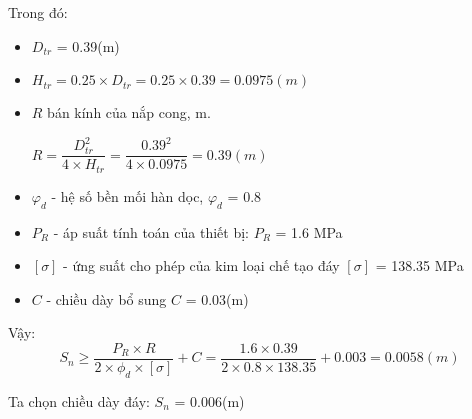 Trong đó:
\begin{itemize}
	\item $D_{tr}$ = 0.39(m)
	\item $H_{tr} = 0.25\times D_{tr} = 0.25 \times 0.39 = 0.0975(m)$
	\item $R$ bán kính của nắp cong, m.
	
	$R = \dfrac{D_{tr}^2}{4\times H_{tr}} = \dfrac{0.39^2}{4 \times 0.0975} = 0.39(m)$
	\item $ \varphi_{d} $ - hệ số bền mối hàn dọc, $\varphi_{d}$ = 0.8
	\item $P_{R}$ - áp suất tính toán của thiết bị: $P_{R}$ = 1.6 MPa
	\item $[\sigma]$ - ứng suất cho phép của kim loại chế tạo đáy $[\sigma]$ = 138.35 MPa 
	\item $C$ - chiều dày bổ sung $C$ = 0.03(m)
\end{itemize}

Vậy: 
\begin{equation*}
	S_{n} \geq \dfrac{P_{R}\times R}{2\times \phi_{d}\times[\sigma]} + C = \dfrac{1.6 \times 0.39}{2 \times 0.8 \times 138.35}+0.003 = 0.0058(m)
\end{equation*}

Ta chọn chiều dày đáy: $S_{n}$ = 0.006(m)
